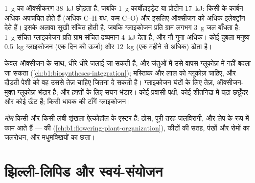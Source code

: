 \begin{proposition}\label{prop:b1:lipids:energystore}
\qty{1}{g}  का ऑक्सीकरण \qty{38}{kJ} छोड़ता है, जबकि \qty{1}{g}
कार्बोहाइड्रेट या प्रोटीन \qty{17}{kJ}: किसी  के कार्बन अधिक
अपचयित होते हैं (अधिक C--H बंध, कम C--O) और इसलिए ऑक्सीजन को अधिक
इलेक्ट्रॉन देते हैं। इसके अलावा  सूखी संचित होती है, जबकि ग्लाइकोजन
प्रति ग्राम लगभग \qty{3}{g} जल बाँधता है: \qty{1}{g} संचित ग्लाइकोजन
प्रति ग्राम संचित द्रव्यमान \qty{4}{kJ} देता है, और  नौ गुना अधिक। कोई
दुबला मनुष्य \qty{0.5}{kg} ग्लाइकोजन (एक दिन की ऊर्जा) और \qty{12}{kg}
 (एक महीने से अधिक) ढोता है।
\end{proposition}

\begin{example}[सब कुछ वसा के रूप में क्यों न संचित करें]\label{ex:b1:lipids:whyglycogen}
 केवल ऑक्सीजन के साथ, धीरे-धीरे जलाई जा सकती है, और जंतुओं में उसे
वापस ग्लूकोज़ में नहीं बदला जा सकता (\cref{ch:b1:biosyntheses-integration});
मस्तिष्क और लाल  को ग्लूकोज़ चाहिए, और दौड़ती पेशी को वह उससे
तेज़ चाहिए जितना  दे सकती है। ग्लाइकोजन घंटों के लिए तेज़,
ऑक्सीजन-मुक्त ग्लूकोज़ भंडार है; और  हफ़्तों के लिए सघन भंडार। कोई
प्रवासी पक्षी, कोई शीतनिद्रा में पड़ा छछूँदर और कोई ऊँट  हैं; किसी
धावक की टाँगें ग्लाइकोजन।
\end{example}

\begin{definition}[मोम]\label{def:b1:lipids:wax}
\emph{मोम} किसी  और किसी लंबी-शृंखला ऐल्कोहॉल के
एस्टर हैं: ठोस, पूरी तरह जलविरागी, और लेप के रूप में काम आते हैं ---
 की  (\cref{ch:b1:flowering-plant-organization}), कीटों की
सतह, पंखों और रोमों का जलरोधन, और मधुमक्खियों का छत्ता।
\end{definition}

\section{झिल्ली-लिपिड और स्वयं-संयोजन}

